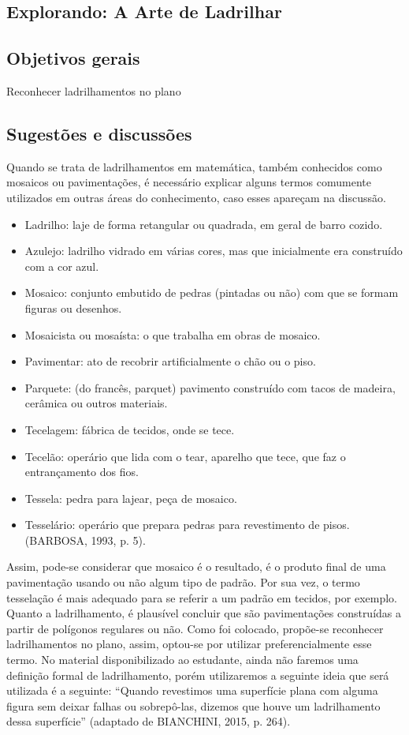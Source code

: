 \def\currentcolor{session1}
\begin{texto}
{
	\section{Explorando: A Arte de Ladrilhar}
	\subsection{Objetivos gerais}

	Reconhecer ladrilhamentos no plano

	\subsection{Sugestões e discussões}
	Quando se trata de ladrilhamentos em matemática, também conhecidos como mosaicos ou pavimentações, é necessário explicar alguns termos comumente utilizados em outras áreas do conhecimento, caso esses apareçam na discussão.

	\begin{itemize}
	\item Ladrilho: laje de forma retangular ou quadrada, em geral de barro cozido.
	\item Azulejo: ladrilho vidrado em várias cores, mas que inicialmente era construído com a cor azul.
	\item Mosaico: conjunto embutido de pedras (pintadas ou não) com que se formam figuras ou desenhos.
	\item Mosaicista ou mosaísta: o que trabalha em obras de mosaico.
	\item Pavimentar: ato de recobrir artificialmente o chão ou o piso.
	\item Parquete: (do francês, parquet) pavimento construído com tacos de madeira, cerâmica ou outros materiais.
	\item Tecelagem: fábrica de tecidos, onde se tece.
	\item Tecelão: operário que lida com o tear, aparelho que tece, que faz o entrançamento dos fios. 
	\item Tessela: pedra para lajear, peça de mosaico.
	\item Tesselário: operário que prepara pedras para revestimento de pisos. (BARBOSA, 1993, p. 5).
	\end{itemize}

	Assim, pode-se considerar que mosaico é o resultado, é o produto final de uma pavimentação usando ou não algum tipo de padrão. Por sua vez, o termo tesselação é mais adequado para se referir a um padrão em tecidos, por exemplo. Quanto a ladrilhamento, é plausível concluir que são pavimentações construídas a partir de  polígonos regulares ou não.  Como foi colocado, propõe-se reconhecer ladrilhamentos no plano, assim, optou-se por utilizar preferencialmente esse termo. 
	No material disponibilizado ao estudante, ainda não faremos uma definição formal de ladrilhamento, porém utilizaremos a seguinte ideia que será utilizada é a seguinte: “Quando revestimos uma superfície plana com alguma figura sem deixar falhas ou sobrepô-las, dizemos que houve um ladrilhamento dessa superfície” (adaptado de BIANCHINI, 2015, p. 264).

}
\end{texto}
